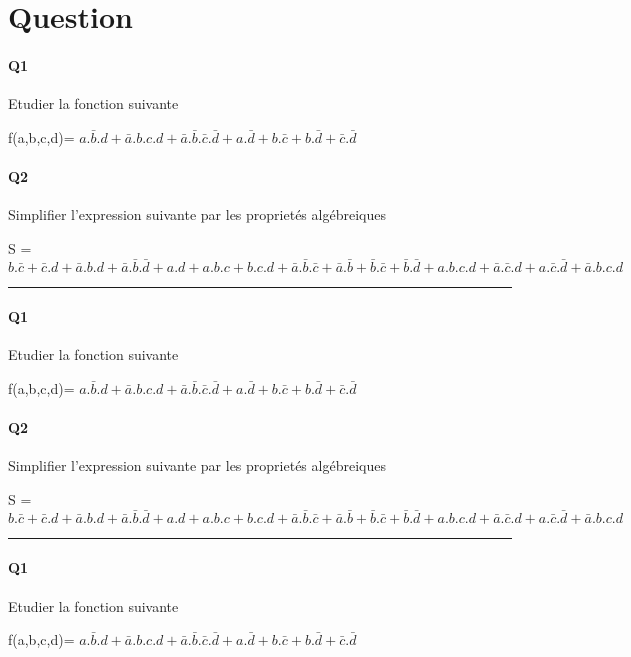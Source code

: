 
\section{Question}

\paragraph{Q1}

Etudier la fonction suivante

f(a,b,c,d)= $a.\bar b.d+\bar a.b.c.d+\bar a.\bar b.\bar c.\bar d + a.\bar d+b.\bar c+b.\bar d+\bar c.\bar d$

\paragraph{Q2}

Simplifier l'expression suivante par les proprietés algébreiques 

S = $b.\bar c+\bar c.d+\bar a.b.d+\bar a.\bar b.\bar d + a.d+a.b.c+b.c.d+\bar a.\bar b.\bar c + \bar a.\bar b+\bar b.\bar c+\bar b.\bar d+a.b.c.d+\bar a.\bar c.d + a.\bar c.\bar d+\bar a.b.c.d$

\hrule width 1\linewidth
\paragraph{Q1}

Etudier la fonction suivante

f(a,b,c,d)= $a.\bar b.d+\bar a.b.c.d+\bar a.\bar b.\bar c.\bar d + a.\bar d+b.\bar c+b.\bar d+\bar c.\bar d$

\paragraph{Q2}

Simplifier l'expression suivante par les proprietés algébreiques 

S = $b.\bar c+\bar c.d+\bar a.b.d+\bar a.\bar b.\bar d + a.d+a.b.c+b.c.d+\bar a.\bar b.\bar c + \bar a.\bar b+\bar b.\bar c+\bar b.\bar d+a.b.c.d+\bar a.\bar c.d + a.\bar c.\bar d+\bar a.b.c.d$

\hrule width 1\linewidth
\paragraph{Q1}

Etudier la fonction suivante

f(a,b,c,d)= $a.\bar b.d+\bar a.b.c.d+\bar a.\bar b.\bar c.\bar d + a.\bar d+b.\bar c+b.\bar d+\bar c.\bar d$

